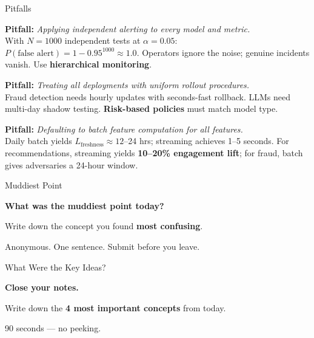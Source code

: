 \documentclass[aspectratio=169, 12pt]{beamer}
\begin{document}
\begin{frame}{Pitfalls}

\footnotesize
\textbf{Pitfall:} \textit{Applying independent alerting to every model and metric.}\\
With $N=1000$ independent tests at $\alpha=0.05$: $P(\text{false alert}) = 1 - 0.95^{1000} \approx 1.0$. Operators ignore the noise; genuine incidents vanish. Use \textbf{hierarchical monitoring}.

\vspace{0.15cm}
\textbf{Pitfall:} \textit{Treating all deployments with uniform rollout procedures.}\\
Fraud detection needs hourly updates with seconds-fast rollback. LLMs need multi-day shadow testing. \textbf{Risk-based policies} must match model type.

\vspace{0.15cm}
\textbf{Pitfall:} \textit{Defaulting to batch feature computation for all features.}\\
Daily batch yields $L_{\text{freshness}} \approx 12$--24 hrs; streaming achieves 1--5 seconds. For recommendations, streaming yields \textbf{10--20\% engagement lift}; for fraud, batch gives adversaries a 24-hour window.

\end{frame}


\begin{frame}{Muddiest Point}

\centering
\vspace{1.0cm}
{\Large\bfseries What was the \alert{muddiest point} today?}

\vspace{0.8cm}
{\normalsize Write down the concept you found \textbf{most confusing}.}

\vspace{0.5cm}
{\small\textcolor{midgray}{Anonymous. One sentence. Submit before you leave.}}

\end{frame}

\begin{frame}{What Were the Key Ideas?}

\centering
\vspace{1.5cm}
{\Large\bfseries Close your notes.}

\vspace{0.8cm}
{\large Write down the \textbf{4 most important concepts} from today.}

\vspace{0.8cm}
{\normalsize\textcolor{midgray}{90 seconds --- no peeking.}}

\end{frame}
\end{document}
